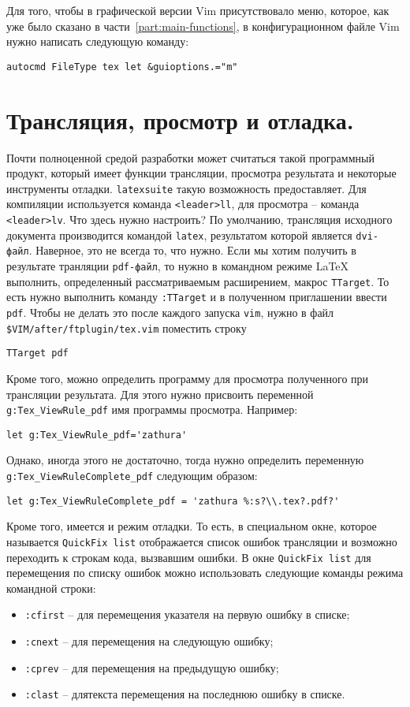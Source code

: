 \documentclass[a4paper]{article}
\begin{document}
Для того, чтобы в графической версии Vim присутствовало меню, которое, как уже было сказано в 
части~\ref{part:main-functions}, в конфигурационном файле Vim нужно написать следующую команду:
\begin{verbatim}
autocmd FileType tex let &guioptions.="m"
\end{verbatim}
\part{Трансляция, просмотр и отладка.}
Почти полноценной средой разработки может считаться такой программный продукт, который
имеет функции трансляции, просмотра результата и некоторые инструменты отладки. \texttt{latexsuite} такую возможность
предоставляет. Для компиляции используется команда \texttt{<leader>ll}, для просмотра -- команда
\texttt{<leader>lv}. Что здесь нужно настроить? По умолчанию, трансляция исходного документа
производится командой \texttt{latex}, результатом которой является \texttt{dvi-файл}. 
Наверное, это не всегда то, что нужно. Если мы хотим получить в результате транляции
\texttt{pdf-файл}, то нужно в командном режиме \LaTeX{} выполнить, определенный рассматриваемым
расширением, макрос \texttt{TTarget}. То есть нужно выполнить команду \verb|:TTarget| и 
в полученном приглашении ввести \texttt{pdf}. Чтобы не делать это после каждого запуска
\texttt{vim}, нужно в файл \verb|$VIM/after/ftplugin/tex.vim| поместить строку
\begin{verbatim}
TTarget pdf
\end{verbatim}
Кроме того, можно определить программу для просмотра полученного при трансляции результата.
Для этого нужно присвоить переменной \verb|g:Tex_ViewRule_pdf| имя программы просмотра. Например:
\begin{verbatim}
let g:Tex_ViewRule_pdf='zathura'
\end{verbatim}
Однако, иногда этого не достаточно, тогда нужно определить переменную \verb|g:Tex_ViewRuleComplete_pdf| 
следующим образом:
\begin{verbatim}
let g:Tex_ViewRuleComplete_pdf = 'zathura %:s?\\.tex?.pdf?'
\end{verbatim}
Кроме того, имеется и режим отладки. То есть, в специальном окне, которое называется \texttt{QuickFix list}
отображается список ошибок трансляции и возможно переходить к строкам кода, вызвавшим ошибки. 
В окне \texttt{QuickFix list} для перемещения по списку ошибок можно использовать следующие команды
режима командной строки:
\begin{itemize}
	\item \verb|:cfirst| -- для перемещения указателя на первую ошибку в списке;
	\item \verb|:cnext| -- для перемещения на следующую ошибку;
	\item \verb|:cprev| -- для перемещения на предыдущую ошибку;
	\item \verb|:clast| -- длятекста перемещения на последнюю ошибку в списке.
\end{itemize}
\end{document}
